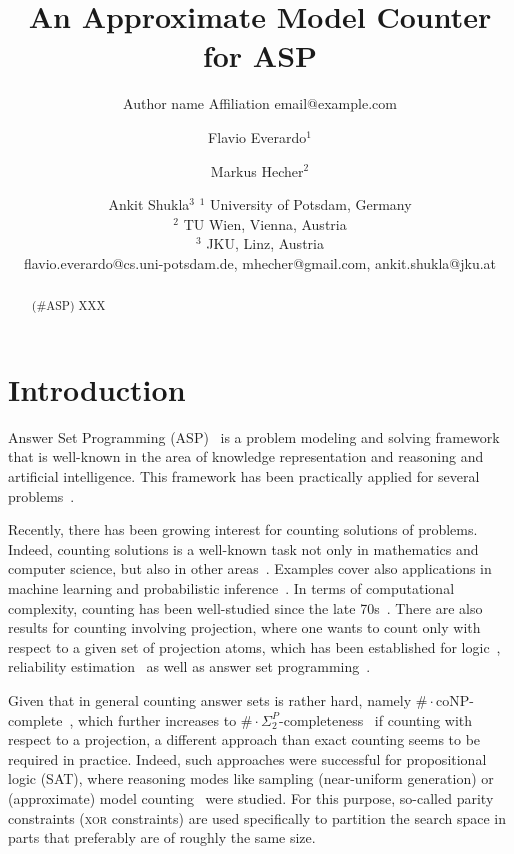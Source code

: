 \documentclass{article}
\title{An Approximate Model Counter for ASP}
\author{%
    Author name
    \affiliations
    Affiliation
    \emails
    email@example.com    %
}
\author{%
Flavio Everardo$^1$\and
Markus Hecher$^2$\and
Ankit Shukla$^{3}$
\affiliations
$^1$ University of Potsdam, Germany\\
$^2$ TU Wien, Vienna, Austria\\
$^3$ JKU, Linz, Austria\\
\emails
flavio.everardo@cs.uni-potsdam.de,
mhecher@gmail.com,
ankit.shukla@jku.at
}
\def\asp{\textsf{\#ASP}\xspace}
\newcommand{\XOR}{\textsc{xor}} %
\begin{document}
\maketitle

\begin{abstract}
(\asp) XXX
\end{abstract}

\section{Introduction} \label{sec:introduction}
%
Answer Set Programming (ASP)~\cite{Lifschitz99,BrewkaEiterTruszczynski11,GebserKaminskiKaufmannSchaub12} is a 
problem modeling and solving framework that is well-known in the area 
of knowledge representation and reasoning and artificial intelligence. 
%
This framework has been practically applied for several 
problems~\cite{BalducciniGelfondNogueira06a,NiemelaSimonsSoininen99,NogueiraBalducciniGelfond01a,GuziolowskiEtAl13a,SchaubWoltran18}.
%

Recently, there has been growing interest for counting solutions of problems.
%
Indeed, counting solutions is a well-known task not only in mathematics and computer
science, but also in other
areas~\cite{ChakrabortyMeelVardi16a,DomshlakHoffmann07a,GomesKautzSabharwalSelman08a,SangBeameKautz05a}.
%
%
%
Examples cover also applications in machine learning and probabilistic inference~\cite{ChaviraDarwiche08a}.
%
%
In terms of computational complexity, counting has been well-studied since the
late
70s~\cite{DurandHermannKolaitis05,HemaspaandraVollmer95a,Valiant79,Valiant79b}.
%
There are also results for counting involving projection, where one wants to
count only with respect to a given set of projection atoms,
which has been established for logic~\cite{AzizChuMuise15a,CapelliMengel19,FichteEtAl18,LagniezMarquis19a,GuptaSharmaRoy19a,SharmaRoySoos19a},
reliability estimation~\cite{MeelEtAl17a} as well as
answer set programming~\cite{GebserKaufmannSchaub09a,Aziz15a,FichteHecher19}.
%

Given that in general counting answer sets is rather hard, namely ${\#\cdot\text{coNP}}$-complete~\cite{FichteEtAl17,DurandHermannKolaitis05}, which further increases
to ${\#\cdot\Sigma_2^P}$-completeness~\cite{FichteHecher19} if counting with respect to a projection,
a different approach than exact counting seems to be required in practice.
%
Indeed, such approaches were successful for propositional logic (SAT), where reasoning modes like sampling (near-uniform generation)
or (approximate) model counting~\cite{gosase07a,gohosase07b,chmeva13a,chmeva13b,soomee19a}
were studied.
%
For this purpose, so-called parity constraints  (\XOR{} constraints) are used specifically to partition the search space in parts that preferably are of roughly the same size.
\end{document}
